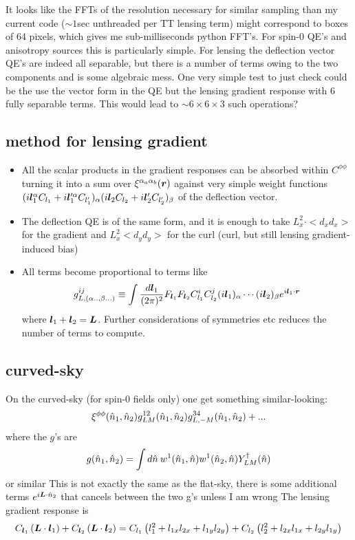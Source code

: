 \documentclass[11pt]{article}
\begin{document}
It looks like the FFTs of the resolution necessary for similar sampling than my current code ($\sim 1 $sec unthreaded per TT lensing term) might correspond to boxes of 64 pixels, which gives me sub-milliseconds python FFT's. 
For spin-0 QE's and anisotropy sources this is particularly simple. For lensing the deflection vector QE's are indeed all separable, but there is a number of terms owing to the two components and is some algebraic mess. One very simple test to just check could be the use the vector form in the QE but the lensing gradient response with 6 fully separable terms. This would lead to $\sim 6 \times 6 \times 3$ such operations?

\subsection{method for lensing gradient}
\begin{itemize}
\item All the scalar products in the gradient responses can be absorbed within $C^{\phi \phi}$ turning it into a sum over $\xi^{\alpha_a \alpha_b}(\boldsymbol{r})$ against very simple weight functions $(i \boldsymbol{l}^\alpha _1 C_{l_1} +i \boldsymbol{l}'^\alpha _1 C_{l'_1} )_\alpha(i \boldsymbol{l}_2 C_{l_2} +i \boldsymbol{l}'_2 C_{l'_2} )_\beta$ of the deflection vector.
\item The deflection QE is of the same form, and it is enough to take $L_x^2\cdot <d_x d_x>$ for the gradient and $L_x^2<d_yd_y>$ for the curl (curl, but still lensing gradient-induced bias)
\item All terms become proportional to terms like
\begin{equation}
	g^{ij}_{L,(\alpha.. , \beta...)} \equiv \int \frac{d\boldsymbol{l}_1}{(2\pi)^2} F_{\boldsymbol{l}_1}F_{\boldsymbol{l}_2} C_{l_1}^{i}C_{l_2}^{j}(i \boldsymbol{l}_1)_{\alpha} \cdots(i \boldsymbol{l}_2)_{\beta} e^{i \boldsymbol{l}_1 \cdot \boldsymbol{r}} 
\end{equation}
where $\boldsymbol{l}_1 + \boldsymbol{l}_2 = \boldsymbol{L}$. Further considerations of symmetries etc reduces the number of terms to compute.
\end{itemize}

\subsection{curved-sky}
On the curved-sky (for spin-0 fields only) one get something similar-looking:
\begin{equation}
\xi^{\phi\phi}({\hat n}_1,{\hat n}_2) g^{12}_{LM}({\hat n}_1,{\hat n}_2) g^{34}_{L,-M}({\hat n}_1,{\hat n}_2) + ...
\end{equation}
where the $g$'s are
\begin{equation}
	g({\hat n}_1, {\hat n}_2) = \int d{\hat n} \:w^1({\hat n}_1, {\hat n})w^1({\hat n}_2, {\hat n}) Y^\dagger_{LM}({\hat n})
\end{equation}
or similar
\color{red} This is not exactly the same as the flat-sky, there is some additional terms $e^{i \boldsymbol{L} \cdot {\hat n}_2}$ that cancels between the two g's unless I am wrong
\color{black}
The lensing gradient response is
\begin{equation}
	C_{\boldsymbol{l}_1} \left( \boldsymbol{L} \cdot \boldsymbol{l}_1 \right) + C_{\boldsymbol{l}_2} \left( \boldsymbol{L} \cdot \boldsymbol{l}_2 \right) = C_{l_1}\left( l_1^2  + l_{1x} l_{2x} + l_{1y} l_{2y}\right) + C_{l_2}\left( l_2^2  + l_{2x} l_{1x} + l_{2y} l_{1y}\right)
\end{equation}
\end{document}
